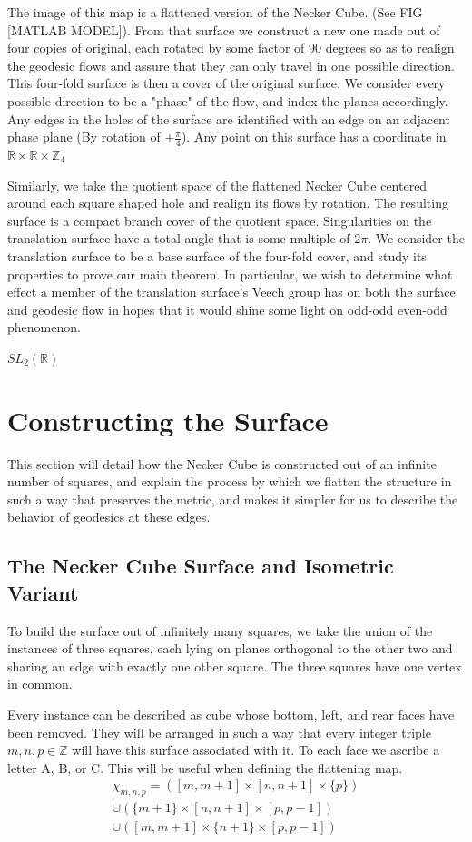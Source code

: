 \documentclass[]{article}
\begin{document}
The image of this map is a flattened version of the Necker Cube. (See FIG [MATLAB MODEL]). From that surface we construct a new one made out of four copies of original, each rotated by some factor of 90 degrees so as to realign the geodesic flows and assure that they can only travel in one possible direction. This four-fold surface is then a cover of the original surface. We consider every possible direction to be a "phase" of the flow, and index the planes accordingly. Any edges in the holes of the surface are identified with an edge on an adjacent phase plane (By rotation of $\pm \frac{\pi}{4}$). Any point on this surface has a coordinate in $\mathbb{R}\times\mathbb{R}\times\mathbb{Z}_{4} $

Similarly, we take the quotient space of the flattened Necker Cube centered around each square shaped hole and realign its flows by rotation. The resulting surface is a compact branch cover of the quotient space. Singularities on the translation surface have a total angle that is some multiple of $2\pi$. We consider the translation surface to be a base surface of the four-fold cover, and study its properties to prove our main theorem. In particular, we wish to determine what effect a member of the translation surface's Veech group has on both the surface and geodesic flow in hopes that it would shine some light on odd-odd even-odd phenomenon.



 $SL_{2}(\mathbb{R})$

\section{Constructing the Surface}
This section will detail how the Necker Cube is constructed out of an infinite number of squares, and explain the process by which we flatten the structure in such a way that preserves the metric, and makes it simpler for us to describe the behavior of geodesics at these edges.

\subsection{The Necker Cube Surface and Isometric Variant }
To build the surface out of infinitely many squares, we take the union of the instances of three squares, each lying on planes orthogonal to the other two and sharing an edge with exactly one other square. The three squares have one vertex in common.

Every instance can be described as cube whose bottom, left, and rear faces have been removed. They will be arranged in such a way that every integer triple $m,n,p\in\mathbb{Z}$ will have this surface associated with it. To each face we ascribe a letter A, B, or C. This will be useful when defining the flattening map.
\begin{gather*}
\chi_{m,n,p} = ([m, m+1]\times[n,n+1]\times\{p\})
\\\cup  (\{m+1\}\times[n,n+1]\times[p,p-1]) 
\\\cup ([m,m+1]\times\{n+1\}\times[p,p-1])
\end{gather*}
\end{document}
